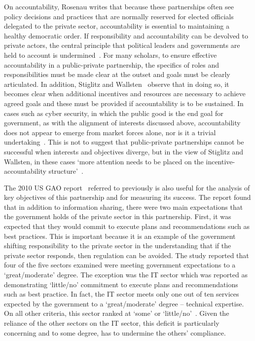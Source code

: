 \documentclass[a4paper,11pt]{article}
\begin{document}
On accountability, Rosenau writes that because these partnerships
often see policy decisions and practices that are normally reserved
for elected officials delegated to the private sector, accountability
is essential to maintaining a healthy democratic order. If
responsibility and accountability can be devolved to private actors,
the central principle that political leaders and governments are held
to account is undermined~\cite{rosenau:1999}.  For many scholars, to
ensure effective accountability in a public-private partnership, the
specifics of roles and responsibilities must be made clear at the
outset and goals must be clearly articulated.  In addition, Stiglitz
and Wallsten~\cite{stiglitz+wallsten:1999} observe that in doing so,
it becomes clear when additional incentives and resources are
necessary to achieve agreed goals and these must be provided if
accountability is to be sustained.  In cases such as cyber security,
in which the public good is the end goal for government, as with the
alignment of interests discussed above, accountability does not appear
to emerge from market forces alone, nor is it a trivial
undertaking~\cite{williams:2014}.  This is not to suggest that
public-private partnerships cannot be successful when interests and
objectives diverge, but in the view of Stiglitz and Wallsten, in these
cases `more attention needs to be placed on the
incentive-accountability structure'~\cite{stiglitz+wallsten:1999}.

The 2010 US GAO report~\cite{usgao:2010} referred to previously is
also useful for the analysis of key objectives of this partnership and
for measuring its success.  The report found that in addition to
information sharing, there were two main expectations that the
government holds of the private sector in this partnership. First, it
was expected that they would commit to execute plans and
recommendations such as best practices. This is important because it
is an example of the government shifting responsibility to the private
sector in the understanding that if the private sector responds, then
regulation can be avoided. The study reported that four of the five
sectors examined were meeting government expectations to a
`great/moderate' degree. The exception was the IT sector which was
reported as demonstrating `little/no' commitment to execute plans and
recommendations such as best practice.  In fact, the IT sector meets
only one out of ten services expected by the government to a
`great/moderate' degree – technical expertise. On all other criteria,
this sector ranked at `some' or `little/no'~\cite{usgao:2010}. Given
the reliance of the other sectors on the IT sector, this deficit is
particularly concerning and to some degree, has to undermine the
others' compliance.
\end{document}
